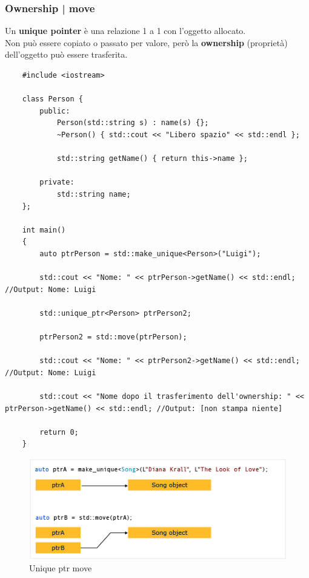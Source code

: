 \subsubsection{Ownership | move}

\textsf{\small Un \textbf{unique pointer} è una relazione 1 a 1 con l'oggetto allocato.} \\

\textsf{\small Non può essere copiato o passato per valore, però la \textbf{ownership} (proprietà) dell'oggetto può essere trasferita.} \\

\begin{lstlisting}
	#include <iostream>
	
	class Person {
		public:
			Person(std::string s) : name(s) {};
			~Person() { std::cout << "Libero spazio" << std::endl };
			
			std::string getName() { return this->name };
			
		private:
			std::string name;
	};

	int main()
	{
		auto ptrPerson = std::make_unique<Person>("Luigi");
		
		std::cout << "Nome: " << ptrPerson->getName() << std::endl; //Output: Nome: Luigi
		
		std::unique_ptr<Person> ptrPerson2;
		
		ptrPerson2 = std::move(ptrPerson);
		
		std::cout << "Nome: " << ptrPerson2->getName() << std::endl; //Output: Nome: Luigi
		
		std::cout << "Nome dopo il trasferimento dell'ownership: " << ptrPerson->getName() << std::endl; //Output: [non stampa niente]
		
		return 0;
	}
\end{lstlisting}

\begin{figure}[H]
	\centering
	\includegraphics[width=1\textwidth, height=1\textheight, keepaspectratio]{./imgs/unique_ptr_move2.png}
	\caption{Unique ptr move}
	\label{fig:unique_ptr_move2}
\end{figure}

